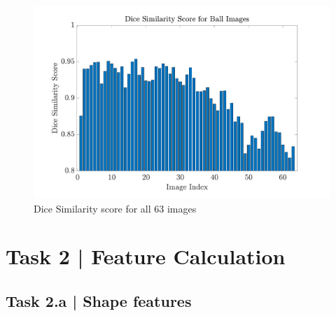 \documentclass[conference]{IEEEtran}
\begin{document}



\begin{figure}[htbp]
    \centering
    \includegraphics[width=\columnwidth]{figures/DS_bar_graph.pdf}
    \caption{Dice Similarity score for all 63 images\label{fig:DS_bar_graph}}
\end{figure}

\section*{Task 2 | Feature Calculation}

\subsection*{Task 2.a | Shape features}
\end{document}
